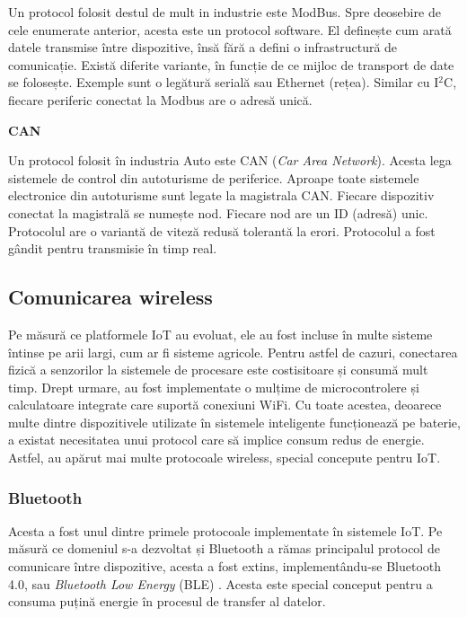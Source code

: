 Un protocol folosit destul de mult in industrie este ModBus. Spre deosebire de
cele enumerate anterior, acesta este un protocol software. El definește cum
arată datele transmise între dispozitive, însă fără a defini o infrastructură
de comunicație. Există diferite variante, în funcție de ce mijloc de transport
de date se folosește. Exemple sunt o legătură serială sau Ethernet (rețea).
Similar cu I$^2$C, fiecare periferic conectat la Modbus are o adresă unică.

\textbf{CAN}

Un protocol folosit în industria Auto este CAN (\textit{Car Area Network}). Acesta lega sistemele de control
din autoturisme de periferice. Aproape toate sistemele electronice din
autoturisme sunt legate la magistrala CAN. Fiecare
dispozitiv conectat la magistrală se numește nod. Fiecare nod are un ID (adresă)
unic. Protocolul are o variantă de viteză redusă tolerantă la
erori. Protocolul a fost gândit pentru transmisie în timp real.

\subsection{Comunicarea wireless}
\label{sec:embed:bus:wireless}

Pe măsură ce platformele IoT au evoluat, ele au fost incluse în multe sisteme
întinse pe arii largi, cum ar fi sisteme agricole. Pentru astfel de cazuri,
conectarea fizică a senzorilor la sistemele de procesare este costisitoare și
consumă mult timp. Drept urmare, au fost implementate o mulțime de
microcontrolere și calculatoare integrate care suportă conexiuni WiFi. Cu toate
acestea, deoarece multe dintre dispozitivele utilizate în sistemele inteligente
funcționează pe baterie, a existat necesitatea unui protocol care să implice
consum redus de energie. Astfel, au apărut mai multe protocoale wireless,
special concepute pentru IoT.

\subsubsection{Bluetooth}
\label{sec:embed:bus:wireless:bluetooth}

Acesta a fost unul dintre primele protocoale implementate în sistemele IoT. Pe
măsură ce domeniul s-a dezvoltat și Bluetooth a rămas principalul protocol de
comunicare între dispozitive, acesta a fost extins, implementându-se Bluetooth
4.0, sau \textit{Bluetooth Low Energy} (BLE) . Acesta
este special conceput pentru a consuma puțină energie în procesul de transfer al
datelor.

